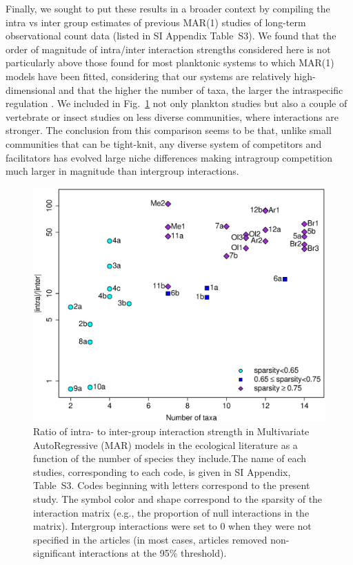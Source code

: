 \documentclass[9pt,twocolumn,twoside,lineno]{pnas-new}
\begin{document}
Finally, we sought to put these results in a broader context by compiling
the intra vs inter group estimates of previous MAR(1) studies of long-term
observational count data (listed in SI Appendix Table~S3). We found
that the order of magnitude of intra/inter interaction strengths considered
here is not particularly above those found for most planktonic systems
to which MAR(1) models have been fitted, considering that our systems
are relatively high-dimensional and that the higher the number of
taxa, the larger the intraspecific regulation \cite{barabas_self-regulation_2017}.
We included in Fig.~\ref{fig:meta_ratio} not only plankton studies
but also a couple of vertebrate or insect studies on less diverse
communities, where interactions are stronger. The conclusion from
this comparison seems to be that, unlike small communities that can
be tight-knit, any diverse system of competitors and facilitators
has evolved large niche differences making intragroup competition
much larger in magnitude than intergroup interactions.

\begin{figure}[!h]
\centering
\includegraphics[width=0.8\linewidth]{Ratio_function_dim}
\caption{Ratio of intra- to inter-group interaction strength in Multivariate
AutoRegressive (MAR) models in the ecological literature as a function
of the number of species they include.The name of each studies,
corresponding to each code, is given in SI Appendix, Table~S3. Codes
beginning with letters correspond to the present study. The symbol
color and shape correspond to the sparsity of the interaction matrix
(e.g., the proportion of null interactions in the matrix). Intergroup
interactions were set to 0 when they were not specified in the articles
(in most cases, articles removed non-significant interactions at the
95\% threshold).} 
\label{fig:meta_ratio}
\end{figure}
\end{document}
